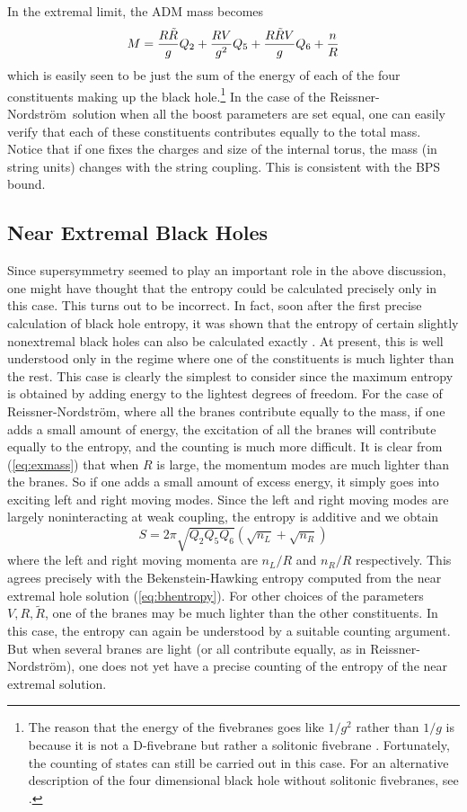 \documentclass[12pt]{article}
\newcommand{\eq}{\begin{equation}}
\newcommand{\eqe}{\end{equation}}
\newcommand{\e}[1]{\label{eq:#1}}
\newcommand{\ee}[1]{(\ref{eq:#1})}
\newcommand{\RN}{Reissner-Nordstr\"om}
\begin{document}
In the extremal limit, the ADM mass becomes
\eq\e{exmass}
M = {R \tilde R\over g} Q_2 + {R V\over g^2} Q_5 + {R\tilde R V\over g} Q_6
+ {n\over R}
\eqe
which is easily seen to be just the sum of the energy of each of the four
constituents making up the black hole.\footnote{The reason that the energy
of the fivebranes goes like $1/g^2$ rather than $1/g$ is because 
it is not
a D-fivebrane but rather a solitonic fivebrane \cite{mast1}. Fortunately,
the counting of states can still be carried out in this case.
For an alternative description
of the four dimensional black hole without solitonic fivebranes, see
\cite{bala}.}
In the case of the \RN\ solution
when all the boost parameters are set equal, one can easily verify that
each of these constituents contributes equally to the total mass.
Notice that if one fixes the charges and size of the internal torus, the
mass (in string units) changes with the string coupling. This is consistent
with the BPS bound.

\subsection{Near Extremal Black Holes}

Since supersymmetry seemed to play an important role in the above 
discussion, one might have thought that the entropy could be calculated
precisely only in this case. This turns out to be incorrect. In fact,
soon after the first precise calculation of black hole entropy, it was
shown that 
the entropy of certain slightly nonextremal black holes
can also be calculated exactly \cite{cama,host2}.  At present, this is
well understood only in the
regime where one of the constituents is much lighter than the rest. This 
case is clearly the simplest to consider since
the maximum entropy is obtained by adding energy to the 
lightest degrees of freedom. For the case of \RN, where all the branes
contribute equally to the mass, if one adds a small amount of energy,
the excitation of
all the branes will contribute equally to the entropy, and the counting
is much more difficult.	It is clear from \ee{exmass} that when $R$ is large,
the momentum modes are
much lighter than the branes. So if one adds a small amount of excess
energy, it simply goes into exciting left and right moving modes. Since
the left and right moving modes are largely
noninteracting at weak coupling, the entropy is additive and we obtain
\eq
S = 2\pi \sqrt{Q_2 Q_5 Q_6 }(\sqrt{n_L} + \sqrt{n_R})
\eqe
where the left and right moving momenta are $n_L/R$ and $n_R/R$
respectively. This agrees precisely
 with the Bekenstein-Hawking  entropy computed
 from the near extremal hole solution \ee{bhentropy}. 
For other choices of the parameters $V, R, 
\tilde R$,
one of the branes may be much lighter than the other constituents. 
In this case, the
entropy can again
be understood by a suitable counting argument.
But when several branes are light (or all contribute equally, as in \RN),
one does not yet have a precise counting of the entropy of
the near extremal solution.
\end{document}
